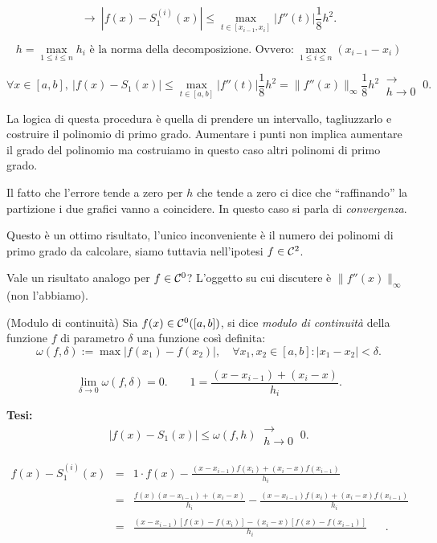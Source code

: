 \[
\longrightarrow \ \left| f(x) - S_1^{(i)}(x)\right| \leq \max_{t \in [x_{i-1},x_i]}
\left|f''(t)\right|\frac{1}{8}h^2.
\]

\[h = \max_{1 \leq i \leq n} h_i \textrm{ è la norma della decomposizione. 
Ovvero:}\  \max_{1 \leq i \leq n}(x_{i-1}-x_i)\]

\[\forall x \in [a,b], \
|f(x) - S_1(x)| \leq \max_{t \in [a,b]}|f''(t)|\frac{1}{8}h^2 = \|f''(x) \|_\infty
\frac{1}{8}h^2\ \substack{\longrightarrow \\ h \to 0} \ 0.
\]

La logica di questa procedura è quella di prendere un intervallo,
tagliuzzarlo e costruire il polinomio di primo grado. Aumentare i punti
non implica aumentare il grado del polinomio ma costruiamo in questo caso
altri polinomi di primo grado.

Il fatto che l'errore tende a zero per $h$ che tende a zero ci dice che
``raffinando'' la partizione i due grafici vanno a coincidere. In questo caso
si parla di \emph{convergenza}.

Questo è un ottimo risultato, l'unico inconveniente è il numero dei polinomi
di primo grado da calcolare, siamo tuttavia nell'ipotesi $f \in \mathcal{C}^2$.

Vale un risultato analogo per $f \in \mathcal{C}^0$? L'oggetto su cui discutere è
$\|f''(x)\|_\infty$ (non l'abbiamo).

\begin{defi}(Modulo di continuità)
Sia $f(x) \in \mathcal{C}^0([a,b])$, si dice \emph{modulo di continuità} della 
funzione $f$ di parametro $\delta$ una funzione così definita:
\[
\omega(f,\delta) := \max |f(x_1) - f(x_2)|, \quad \forall x_1, x_2 \in [a,b]
\colon |x_1-x_2| < \delta.
\]
\end{defi}

\begin{osse}
\[\lim_{\delta \to 0}\omega(f, \delta) = 0. \qquad 1 = 
\frac{(x-x_{i-1})+(x_i-x)}{h_i}.\]
\end{osse}

\textbf{Tesi:}
\[
|f(x) - S_1(x)| \leq \omega(f, h)\ \substack{\longrightarrow \\ h \to 0} \ 0.
\]

\[
\begin{array}{lcl}
f(x) - S^{(i)}_1(x) & = & 1 \cdot f(x) - \frac{(x-x_{i-1})f(x_i) + 
(x_i-x)f(x_{i-1})}{h_i}^{\phantom{(1)}} \\
& = & \frac{f(x)(x-x_{i-1}) + (x_i-x)}{h_i} -
\frac{(x-x_{i-1})f(x_i)+(x_i-x)f(x_{i-1})}{h_i}^{\phantom{(1)}} \\
& = & \frac{(x-x_{i-1})[f(x)-f(x_i)]-(x_i-x)[f(x)-
f(x_{i-1})]}{h_i}^{\phantom{(1)}}.
\end{array}
\]

